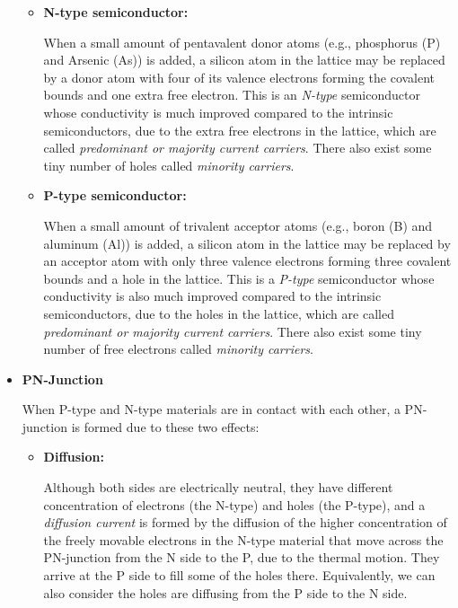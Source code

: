 \begin{itemize}


\begin{itemize}
\item {\bf N-type semiconductor:}

When a small amount of pentavalent donor atoms (e.g., phosphorus (P) and
Arsenic (As)) is added, a silicon atom in the lattice may be replaced by
a donor atom with four of its valence electrons forming the covalent bounds 
and one extra free electron. This is an {\em N-type} semiconductor whose 
conductivity is much improved compared to the intrinsic semiconductors, due 
to the extra free electrons in the lattice, which are called {\em predominant
or majority current carriers}. There also exist some tiny number of holes 
called {\em minority carriers}.

\item {\bf P-type semiconductor:}

When a small amount of trivalent acceptor atoms (e.g., boron (B) and aluminum
(Al)) is added, a silicon atom in the lattice may be replaced by an acceptor
atom with only three valence electrons forming three covalent bounds and a 
hole in the lattice. This is a {\em P-type} semiconductor whose conductivity 
is also much improved compared to the intrinsic semiconductors, due to the 
holes in the lattice, which are called {\em predominant or majority current 
carriers}. There also exist some tiny number of free electrons called 
{\em minority carriers}.
\end{itemize}


\item {\bf PN-Junction}

When P-type and N-type materials are in contact with each other, a 
PN-junction is formed due to these two effects:
\begin{itemize}
\item {\bf Diffusion:}

Although both sides are electrically neutral, they have different
concentration of electrons (the N-type) and holes (the P-type), and 
a {\em diffusion current} is formed by the diffusion of the higher
concentration of the freely movable electrons in the N-type material 
that move across the PN-junction from the N side to the P, due to the
thermal motion. They arrive at the P side to fill some of the holes
there. Equivalently, we can also consider the holes are diffusing
from the P side to the N side.


\end{itemize}
\end{itemize}
